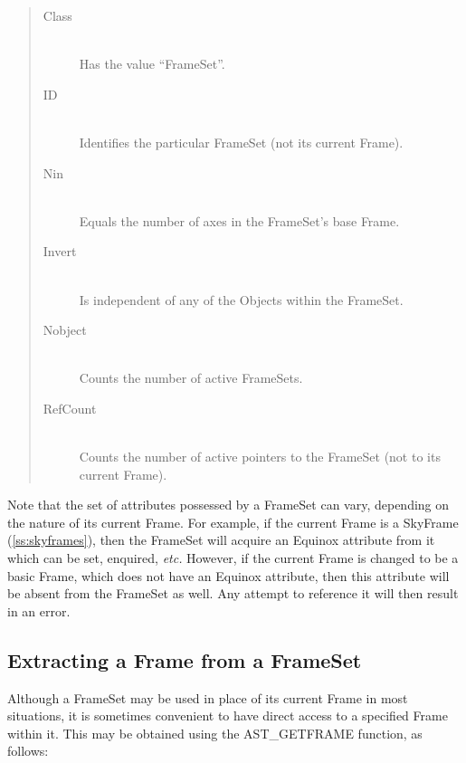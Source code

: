 \documentclass[twoside,11pt]{article}
\newcommand{\htmlref}[2]{#1}
\newcommand{\secref}[1]{\S\ref{#1}}
\renewcommand{\secref}[1]{\ref{#1}}
\begin{document}
\begin{quote}
\begin{description}
\item[\htmlref{Class}{Class}]\mbox{}\\
Has the value ``FrameSet''.

\item[\htmlref{ID}{ID}]\mbox{}\\
Identifies the particular FrameSet (not its current Frame).

\item[\htmlref{Nin}{Nin}]\mbox{}\\
Equals the number of axes in the FrameSet's base Frame.

\item[\htmlref{Invert}{Invert}]\mbox{}\\
Is independent of any of the Objects within the FrameSet.

\item[\htmlref{Nobject}{Nobject}]\mbox{}\\
Counts the number of active FrameSets.

\item[\htmlref{RefCount}{RefCount}]\mbox{}\\
Counts the number of active pointers to the FrameSet (not to its
current Frame).
\end{description}
\end{quote}

Note that the set of attributes possessed by a FrameSet can vary,
depending on the nature of its current Frame. For example, if the
current Frame is a \htmlref{SkyFrame}{SkyFrame} (\secref{ss:skyframes}), then the FrameSet
will acquire an \htmlref{Equinox}{Equinox} attribute from it which can be set, enquired,
{\em{etc.}}  However, if the current Frame is changed to be a basic
Frame, which does not have an Equinox attribute, then this attribute
will be absent from the FrameSet as well. Any attempt to reference it
will then result in an error.

\subsection{Extracting a Frame from a FrameSet}

Although a \htmlref{FrameSet}{FrameSet} may be used in place of its current \htmlref{Frame}{Frame} in most
situations, it is sometimes convenient to have direct access to a
specified Frame within it. This may be obtained using the
\htmlref{AST\_GETFRAME}{AST_GETFRAME} function, as follows:
\end{document}
